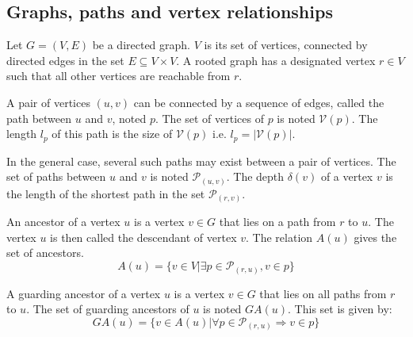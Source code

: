\subsection{Graphs, paths and vertex relationships}


Let $G=(V, E)$ be a directed graph. $V$ is its set of vertices, connected by directed edges in the set $E \subseteq V \times V$. A rooted graph has a designated vertex $r \in V$ such that all other vertices are reachable from $r$.

A pair of vertices $(u, v)$ can be connected by a sequence of edges, called the path between $u$ and $v$, noted $p$. The set of vertices of $p$ is noted $\mathcal{V}(p)$. The length $l_p$ of this path is the size of $\mathcal{V}(p)$ i.e. $l_p = \lvert \mathcal{V}(p)\rvert$.


In the general case, several such paths may exist between a pair of vertices.
The set of paths between $u$ and $v$ is noted $\mathcal{P}_{(u,v)}$.
The depth $\delta(v)$ of a vertex $v$ is the length of the shortest path in the set $\mathcal{P}_{(r,v)}$.
\begin{definition}
	An ancestor of a vertex $u$ is a vertex $v \in G$ that lies on a path from $r$ to $u$. The vertex $u$ is then called the descendant of vertex $v$.
	The relation $A(u)$ gives the set of ancestors.
	\begin{equation*}
		A(u)=\{v\in V|\exists p\in \mathcal{P}_{(r,u)}, v \in p\}
	\end{equation*}
\end{definition}

\begin{definition}
	A guarding ancestor of a vertex $u$ is a vertex $v \in G$ that lies on all paths from $r$ to $u$.
	The set of guarding ancestors of $u$ is noted $\mathit{GA}(u)$.
	This set is given by:
	\begin{equation*}
		\mathit{GA}(u) =	\{v\in A(u)|\forall p\in \mathcal{P}_{(r,u)}\Rightarrow v\in p\}
	\end{equation*}
\end{definition}

